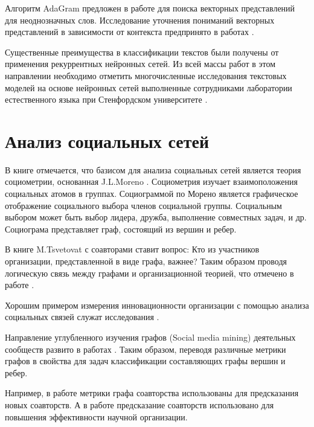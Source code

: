 Алгоритм AdaGram предложен в работе \cite{bartunov2016breaking} для  поиска векторных представлений для неоднозначных слов.
Исследование уточнения пониманий векторных представлений в зависимости от контекста предпринято в работах \cite{huang2012improving,gladkova2016intrinsic}. 
 
Существенные преимущества в классификации текстов были получены от применения рекуррентных нейронных сетей. 
Из всей массы работ в этом направлении необходимо отметить многочисленные исследования текстовых моделей на основе нейронных сетей
выполненные сотрудниками лаборатории естественного языка при Стенфордском университете \cite{schuster2018gapping,eric2017copy,wang2017naturalizing,li2017adversarial,xie2017data}.

\section{Анализ социальных сетей}

В книге \cite{de2018exploratory} отмечается, что базисом для анализа социальных сетей является теория социометрии, основанная J.L.Moreno \cite{moreno1953shall}. 
Социометрия изучает взаимоположения социальных атомов в группах. 
Социограммой по Морено является графическое отображение социального выбора членов социальной группы.
Социальным выбором может быть выбор лидера, дружба, выполнение совместных задач, и др. 
Социограма представляет граф, состоящий из вершин и ребер. 

В книге \cite{tsvetovat2011social} M.Tsvetovat  с соавторами ставит вопрос:
Кто из участников организации, представленной в виде графа, важнее? 
Таким образом проводя логическую связь между графами и организационной теорией, что отмечено в работе \cite{atherley2015model}.

Хорошим примером измерения инновационности организации с помощью анализа социальных связей служат исследования \cite{porter2018mapping} .

Направление углубленного изучения графов (Social media mining) деятельных сообществ развито в работах \cite{kurmukov2016classification,zafarani2014social}. Таким образом, переводя различные метрики графов в свойства для задач классификации составляющих графы вершин и ребер. 

Например, в работе \cite{makarov2016co}  метрики графа соавторства использованы для предсказания новых соавторств.
А в работе \cite{makarov2018recommending} предсказание соавторств использовано для повышения эффективности научной организации.

